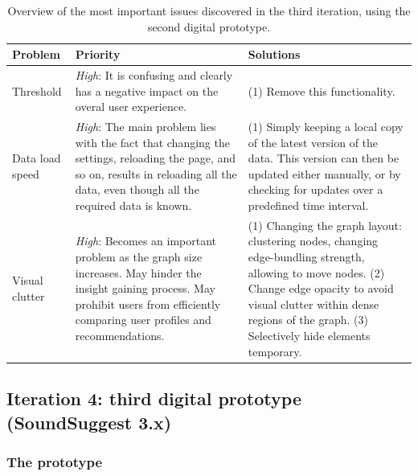 \begin{table}
	\caption{Overview of the most important issues discovered in the third iteration, using the second digital prototype.}
	\begin{center}
		\begin{tabular}{p{70px} | p{180px} | p{180px} }
			\hline
			\textbf{Problem} & \textbf{Priority} & \textbf{Solutions} \\
			\hline
			
			Threshold
			&
			\emph{High}: It is confusing and clearly has a negative impact on the overal user experience.
			&
			(1) Remove this functionality.
			\\
			
			Data load speed
			&
			\emph{High}: The main problem lies with the fact that changing the settings, reloading the page, and so on, results in reloading all the data, even though all the required data is known.
			&
			(1) Simply keeping a local copy of the latest version of the data. This version can then be updated either manually, or by checking for updates over a predefined time interval.
			\\
			
			Visual clutter
			&
			\emph{High}: Becomes an important problem as the graph size increases. May hinder the insight gaining process. May prohibit users from efficiently comparing user profiles and recommendations.
			&
			(1) Changing the graph layout: clustering nodes, changing edge-bundling strength, allowing to move nodes. (2) Change edge opacity to avoid visual clutter within dense regions of the graph. (3) Selectively hide elements temporary.
			\\
			
			\hline
		\end{tabular}
	\end{center}
\label{table:iteration3:issues}
\end{table}




\subsection{Iteration 4: third digital prototype (SoundSuggest 3.x)}\label{chapter:prototype:section:soundsuggest3}

\subsubsection{The prototype}\label{chapter:prototype:section:soundsuggest3:prototype}

